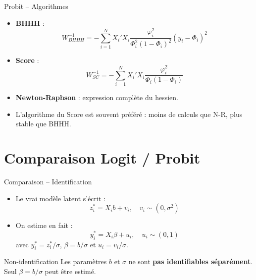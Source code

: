 \documentclass[11pt,aspectratio=169]{beamer}
\begin{document}
\begin{frame}{Probit -- Algorithmes}

\begin{itemize}

\item \textbf{BHHH} :
  \[
  W_{BHHH}^{-1} = -\sum_{i=1}^{N} X_i' X_i \frac{\varphi_i^2}{\Phi_i^2(1-\Phi_i)^2} (y_i - \Phi_i)^2
  \]

\item \textbf{Score} :
  \[
  W_{SC}^{-1} = -\sum_{i=1}^{N} X_i' X_i \frac{\varphi_i^2}{\Phi_i(1-\Phi_i)}
  \]

\item \textbf{Newton-Raphson} : expression complète du hessien.\newline

\item L'algorithme du Score est souvent préféré : moins de calculs que N-R,
  plus stable que BHHH.

\end{itemize}

\end{frame}

\section{Comparaison Logit / Probit}

\begin{frame}{Comparaison -- Identification}

\begin{itemize}

\item Le vrai modèle latent s'écrit :
  \[
  z_i^* = X_i b + v_i, \quad v_i \sim (0, \sigma^2)
  \]

\item On estime en fait :
  \[
  y_i^* = X_i \beta + u_i, \quad u_i \sim (0, 1)
  \]
  avec $y_i^* = z_i^*/\sigma$, $\beta = b/\sigma$ et $u_i = v_i/\sigma$.

\end{itemize}

\begin{alertblock}{Non-identification}
Les paramètres $b$ et $\sigma$ ne sont \textbf{pas identifiables séparément}. Seul $\beta = b/\sigma$ peut être estimé.
\end{alertblock}

\end{frame}
\end{document}
